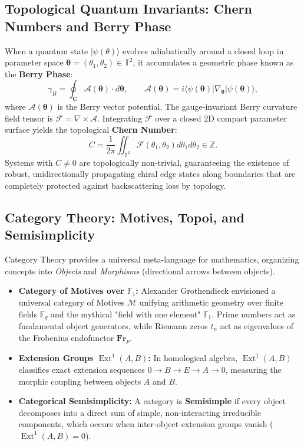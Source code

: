 \documentclass[11pt,a4paper]{article}
\begin{document}
\subsection{Topological Quantum Invariants: Chern Numbers and Berry Phase}
When a quantum state $|\psi(\theta)\rangle$ evolves adiabatically around a closed loop in parameter space $\mathbf{\theta} = (\theta_1, \theta_2) \in \mathbb{T}^2$, it accumulates a geometric phase known as the \textbf{Berry Phase}:
\begin{equation}
\gamma_B = \oint_{\mathbf{C}} \mathcal{A}(\mathbf{\theta}) \cdot d\mathbf{\theta}, \qquad \mathcal{A}(\mathbf{\theta}) = i \langle \psi(\mathbf{\theta}) | \nabla_{\mathbf{\theta}} | \psi(\mathbf{\theta}) \rangle,
\end{equation}
where $\mathcal{A}(\mathbf{\theta})$ is the Berry vector potential. The gauge-invariant Berry curvature field tensor is $\mathcal{F} = \nabla \times \mathcal{A}$. Integrating $\mathcal{F}$ over a closed 2D compact parameter surface yields the topological \textbf{Chern Number}:
\begin{equation}
C = \frac{1}{2\pi} \iint_{\mathbb{T}^2} \mathcal{F}(\theta_1, \theta_2) d\theta_1 d\theta_2 \in \mathbb{Z}.
\end{equation}
Systems with $C \neq 0$ are topologically non-trivial, guaranteeing the existence of robust, unidirectionally propagating chiral edge states along boundaries that are completely protected against backscattering loss by topology.

\subsection{Category Theory: Motives, Topoi, and Semisimplicity}
Category Theory provides a universal meta-language for mathematics, organizing concepts into \emph{Objects} and \emph{Morphisms} (directional arrows between objects).
\begin{itemize}
    \item \textbf{Category of Motives over $\mathbb{F}_1$:} Alexander Grothendieck envisioned a universal category of Motives $\mathcal{M}$ unifying arithmetic geometry over finite fields $\mathbb{F}_q$ and the mythical "field with one element" $\mathbb{F}_1$. Prime numbers act as fundamental object generators, while Riemann zeros $t_n$ act as eigenvalues of the Frobenius endofunctor $\mathbf{Fr}_p$.
    \item \textbf{Extension Groups $\operatorname{Ext}^1(A, B)$:} In homological algebra, $\operatorname{Ext}^1(A, B)$ classifies exact extension sequences $0 \to B \to E \to A \to 0$, measuring the morphic coupling between objects $A$ and $B$.
    \item \textbf{Categorical Semisimplicity:} A category is \textbf{Semisimple} if every object decomposes into a direct sum of simple, non-interacting irreducible components, which occurs when inter-object extension groups vanish ($\operatorname{Ext}^1(A, B) = 0$).
\end{itemize}
\end{document}
